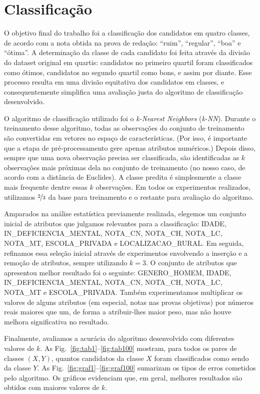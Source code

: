\documentclass[12pt]{article}
\begin{document}
\section{Classificação}
O objetivo final do trabalho foi a classificação dos candidatos em quatro classes, de acordo com a nota obtida na prova de redação: ``ruim'', ``regular'', ``boa'' e ``ótima''.
A determinação da classe de cada candidato foi feita através da divisão do dataset original em quartis: candidatos no primeiro quartil foram classificados como ótimos, candidatos no segundo quartil como bons, e assim por diante.
Esse processo resulta em uma divisão equitativa dos candidatos em classes, e consequentemente simplifica uma avaliação justa do algoritmo de classificação desenvolvido.

O algoritmo de classificação utilizado foi o \emph{k-Nearest Neighbors} (\emph{k-NN}).
Durante o treinamento desse algoritmo, todas as observações do conjunto de treinamento são convertidas em vetores no espaço de características.
(Por isso, é importante que a etapa de pré-processamento gere apenas atributos numéricos.)
Depois disso, sempre que uma nova observação precisa ser classificada, são identificadas as $k$ observações mais próximas dela no conjunto de treinamento (no nosso caso, de acordo com a distância de Euclides).
A classe predita é simplesmente a classe mais frequente dentre essas $k$ observações.
Em todos os experimentos realizados, utilizamos $\nicefrac{2}{3}$ da base para treinamento e o restante para avaliação do algoritmo.

Amparados na análise estatística previamente realizada, elegemos um conjunto inicial de atributos que julgamos relevantes para a classificação: IDADE, IN\_DEFICIENCIA\_MENTAL, NOTA\_CN, NOTA\_CH, NOTA\_LC, NOTA\_MT, ESCOLA\_PRIVADA e LOCALIZACAO\_RURAL.
Em seguida, refinamos essa seleção inicial através de experimentos envolvendo a inserção e a remoção de atributos, sempre utilizando $k=3$.
O conjunto de atributos que apresentou melhor resultado foi o seguinte: GENERO\_HOMEM, IDADE, IN\_DEFICIENCIA\_MENTAL, NOTA\_CN, NOTA\_CH, NOTA\_LC, NOTA\_MT e ESCOLA\_PRIVADA.
Também experimentamos multiplicar os valores de alguns atributos (em especial, notas nas provas objetivas) por números reais maiores que um, de forma a atribuir-lhes maior peso, mas não houve melhora significativa no resultado.

Finalmente, avaliamos a acurácia do algoritmo desenvolvido com diferentes valores de $k$.
As Fig.~\ref{fig:tab1}--\ref{fig:tab100} mostram, para todos os pares de classes $(X, Y)$, quantos candidatos da classe $X$ foram classificados como sendo da classe $Y$.
As Fig.~\ref{fig:graf1}--\ref{fig:graf100} sumarizam os tipos de erros cometidos pelo algoritmo.
Os gráficos evidenciam que, em geral, melhores resultados são obtidos com maiores valores de $k$.
\end{document}
